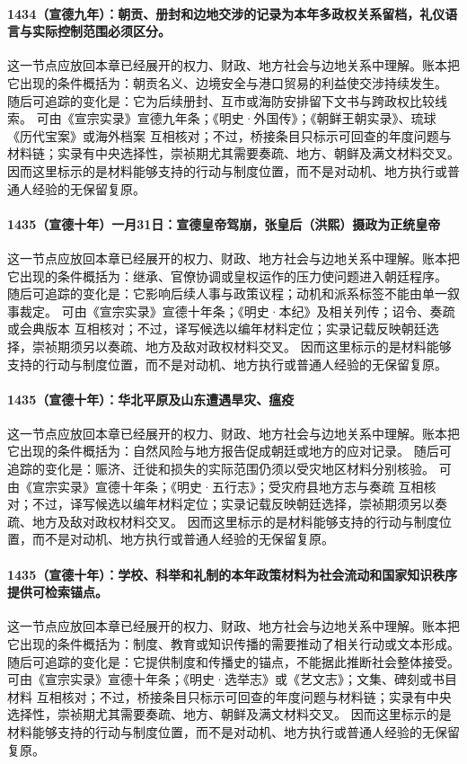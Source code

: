 \paragraph{1434（宣德九年）：朝贡、册封和边地交涉的记录为本年多政权关系留档，礼仪语言与实际控制范围必须区分。} 这一节点应放回本章已经展开的权力、财政、地方社会与边地关系中理解。账本把它出现的条件概括为：朝贡名义、边境安全与港口贸易的利益使交涉持续发生。 随后可追踪的变化是：它为后续册封、互市或海防安排留下文书与跨政权比较线索。 可由《宣宗实录》宣德九年条；《明史·外国传》；《朝鲜王朝实录》、琉球《历代宝案》或海外档案 互相核对；不过，桥接条目只标示可回查的年度问题与材料链；实录有中央选择性，崇祯期尤其需要奏疏、地方、朝鲜及满文材料交叉。 因而这里标示的是材料能够支持的行动与制度位置，而不是对动机、地方执行或普通人经验的无保留复原。

\paragraph{1435（宣德十年）一月31日：宣德皇帝驾崩，张皇后（洪熙）摄政为正统皇帝} 这一节点应放回本章已经展开的权力、财政、地方社会与边地关系中理解。账本把它出现的条件概括为：继承、官僚协调或皇权运作的压力使问题进入朝廷程序。 随后可追踪的变化是：它影响后续人事与政策议程；动机和派系标签不能由单一叙事裁定。 可由《宣宗实录》宣德十年条；《明史·本纪》及相关列传；诏令、奏疏或会典版本 互相核对；不过，译写候选以编年材料定位；实录记载反映朝廷选择，崇祯期须另以奏疏、地方及敌对政权材料交叉。 因而这里标示的是材料能够支持的行动与制度位置，而不是对动机、地方执行或普通人经验的无保留复原。

\paragraph{1435（宣德十年）：华北平原及山东遭遇旱灾、瘟疫} 这一节点应放回本章已经展开的权力、财政、地方社会与边地关系中理解。账本把它出现的条件概括为：自然风险与地方报告促成朝廷或地方的应对记录。 随后可追踪的变化是：赈济、迁徙和损失的实际范围仍须以受灾地区材料分别核验。 可由《宣宗实录》宣德十年条；《明史·五行志》；受灾府县地方志与奏疏 互相核对；不过，译写候选以编年材料定位；实录记载反映朝廷选择，崇祯期须另以奏疏、地方及敌对政权材料交叉。 因而这里标示的是材料能够支持的行动与制度位置，而不是对动机、地方执行或普通人经验的无保留复原。

\paragraph{1435（宣德十年）：学校、科举和礼制的本年政策材料为社会流动和国家知识秩序提供可检索锚点。} 这一节点应放回本章已经展开的权力、财政、地方社会与边地关系中理解。账本把它出现的条件概括为：制度、教育或知识传播的需要推动了相关行动或文本形成。 随后可追踪的变化是：它提供制度和传播史的锚点，不能据此推断社会整体接受。 可由《宣宗实录》宣德十年条；《明史·选举志》或《艺文志》；文集、碑刻或书目材料 互相核对；不过，桥接条目只标示可回查的年度问题与材料链；实录有中央选择性，崇祯期尤其需要奏疏、地方、朝鲜及满文材料交叉。 因而这里标示的是材料能够支持的行动与制度位置，而不是对动机、地方执行或普通人经验的无保留复原。

